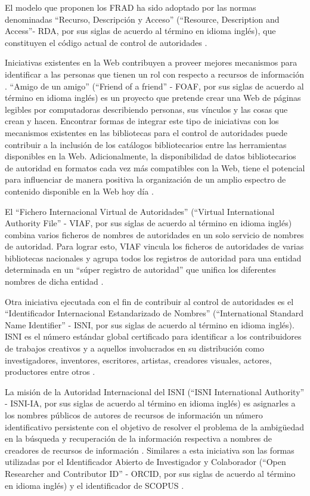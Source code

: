 El modelo que proponen los FRAD ha sido adoptado por las normas denominadas ``Recurso, Descripción y Acceso'' (``Resource, Description and Access''- RDA, por sus siglas de acuerdo al término en idioma inglés), que constituyen el código actual de control de autoridades \citep{Sandberg2016}.

Iniciativas existentes en la Web contribuyen a proveer mejores mecanismos para identificar a las personas que tienen un rol con respecto a recursos de información \citep{Harper2007}. ``Amigo de un amigo'' (``Friend of a friend'' - FOAF, por sus siglas de acuerdo al término en idioma inglés) es un proyecto que pretende crear una Web de páginas legibles por computadoras describiendo personas, sus vínculos y las cosas que crean y hacen. Encontrar formas de integrar este tipo de iniciativas con los mecanismos existentes en las bibliotecas para el control de autoridades puede contribuir a la inclusión de los catálogos bibliotecarios entre las herramientas disponibles en la Web. Adicionalmente, la disponibilidad de datos bibliotecarios de autoridad en formatos cada vez más compatibles con la Web, tiene el potencial para influenciar de manera positiva la organización de un amplio espectro de contenido disponible en la Web hoy día \citep{Harper2007}.

El ``Fichero Internacional Virtual de Autoridades'' (``Virtual International Authority File'' - VIAF, por sus siglas de acuerdo al término en idioma inglés) combina varios ficheros de nombres de autoridades en un solo servicio de nombres de autoridad. Para lograr esto, VIAF vincula los ficheros de autoridades de varias bibliotecas nacionales y agrupa todos los registros de autoridad para una entidad determinada en un ``súper registro de autoridad'' que unifica los diferentes nombres de dicha entidad \citep{OCLCOnlineComputerLibraryCenterInc.2014}.

Otra iniciativa ejecutada con el fin de contribuir al control de autoridades es el ``Identificador Internacional Estandarizado de Nombres'' (``International Standard Name Identifier'' - ISNI, por sus siglas de acuerdo al término en idioma inglés). ISNI es el número estándar global certificado para identificar a los contribuidores de trabajos creativos y a aquellos involucrados en su distribución como investigadores, inventores, escritores, artistas, creadores visuales, actores, productores entre otros \citep{ISNIInternationalStandardNameIdentifier2017}.

La misión de la Autoridad Internacional del ISNI (``ISNI International Authority'' - ISNI-IA, por sus siglas de acuerdo al término en idioma inglés) es asignarles a los nombres públicos de autores de recursos de información un número identificativo persistente con el objetivo de resolver el problema de la ambigüedad en la búsqueda y recuperación de la información respectiva a nombres de creadores de recursos de información \citep{ISNIInternationalStandardNameIdentifier2017}. Similares a esta iniciativa son las formas utilizadas por el Identificador Abierto de Investigador y Colaborador (``Open Researcher and Contributor ID'' - ORCID, por sus siglas de acuerdo al término en idioma inglés) \citep{ORCID2017} y el identificador de SCOPUS \citep{Elsevier2016}.

